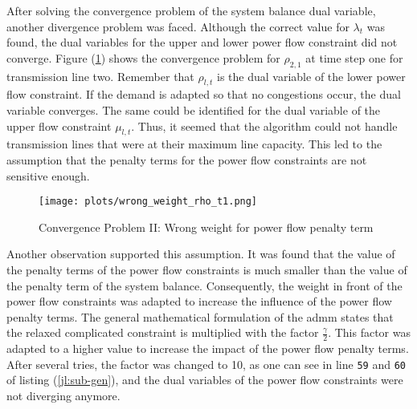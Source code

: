 After solving the convergence problem of the system balance dual variable, another divergence problem was faced. Although the correct value for $\lambda_t$ was found, the dual variables for the upper and lower power flow constraint did not converge. Figure (\ref{fig:conv-problem-2}) shows the convergence problem for $\rho_{2,1}$ at time step one for transmission line two. Remember that $\rho_{l,t}$ is the dual variable of the lower power flow constraint. If the demand is adapted so that no congestions occur, the dual variable converges. The same could be identified for the dual variable of the upper flow constraint $\mu_{l,t}$. Thus, it seemed that the algorithm could not handle transmission lines that were at their maximum line capacity. This led to the assumption that the penalty terms for the power flow constraints are not sensitive enough. \\

\begin{figure}[h!]
	\centering
	\texttt{[image: plots/wrong\_weight\_rho\_t1.png]}
	\caption{Convergence Problem II: Wrong weight for power flow penalty term}
	\label{fig:conv-problem-2}
\end{figure}

Another observation supported this assumption. It was found that the value of the penalty terms of the power flow constraints is much smaller than the value of the penalty term of the system balance. Consequently, the weight in front of the power flow constraints was adapted to increase the influence of the power flow penalty terms. The general mathematical formulation of the \gls{admm} states that the relaxed complicated constraint is multiplied with the factor $\frac{\gamma}{2}$. This factor was adapted to a higher value to increase the impact of the power flow penalty terms. After several tries, the factor was changed to 10, as one can see in line \texttt{59} and \texttt{60} of listing (\ref{jl:sub-gen}), and the dual variables of the power flow constraints were not diverging anymore. \\

